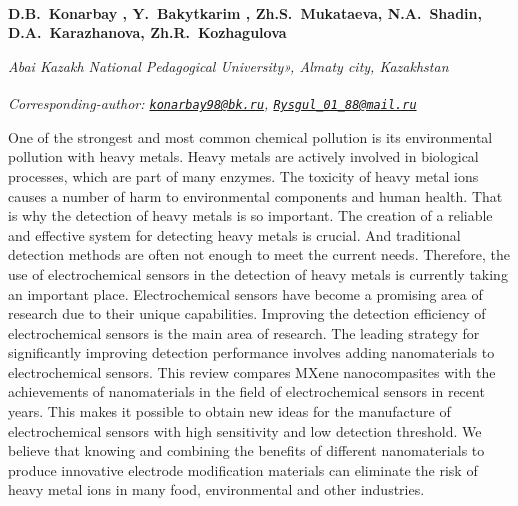 
\begin{articleheader}

{\bfseries D.B.~Konarbay\textsuperscript{\envelope } \alink{},
Y.~Bakytkarim\textsuperscript{\envelope } ,
Zh.S.~Mukataeva,
N.A.~Shadin,
D.A.~Karazhanova,
Zh.R.~Kozhagulova}
\end{articleheader}
\vspace{0.5em}
\begin{affiliation}
\emph{Abai Kazakh National Pedagogical University», Almaty city, Kazakhstan}

\raggedright \textsuperscript{\envelope }{\em Corresponding-author: \emph{\href{mailto:konarbay98@bk.ru}{\nolinkurl{konarbay98@bk.ru}}, \href{mailto:Rysgul_01_88@mail.ru}{\nolinkurl{Rysgul\_01\_88@mail.ru}}}}
\end{affiliation}

One of the strongest and most common chemical pollution is its
environmental pollution with heavy metals. Heavy metals are actively
involved in biological processes, which are part of many enzymes. The
toxicity of heavy metal ions causes a number of harm to environmental
components and human health. That is why the detection of heavy metals
is so important. The creation of a reliable and effective system for
detecting heavy metals is crucial. And traditional detection methods are
often not enough to meet the current needs. Therefore, the use of
electrochemical sensors in the detection of heavy metals is currently
taking an important place. Electrochemical sensors have become a
promising area of research due to their unique capabilities. Improving
the detection efficiency of electrochemical sensors is the main area of
research. The leading strategy for significantly improving detection
performance involves adding nanomaterials to electrochemical sensors.
This review compares MXene nanocompasites with the achievements of
nanomaterials in the field of electrochemical sensors in recent years.
This makes it possible to obtain new ideas for the manufacture of
electrochemical sensors with high sensitivity and low detection
threshold. We believe that knowing and combining the benefits of
different nanomaterials to produce innovative electrode modification
materials can eliminate the risk of heavy metal ions in many food,
environmental and other industries.

